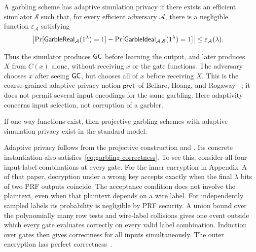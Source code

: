 \begin{definition}
\label{def:adaptive-garbling}
A garbling scheme has adaptive simulation privacy if there exists an
efficient simulator $\mathcal S$ such that, for every efficient adversary
$\mathcal A$, there is a negligible function $\varepsilon_{\mathcal A}$
satisfying
\[
  \left|
    \Pr[\mathsf{GarbleReal}_{\mathcal A}(1^\lambda)=1]
    -\Pr[\mathsf{GarbleIdeal}_{\mathcal A,\mathcal S}(1^\lambda)=1]
  \right|\leq\varepsilon_{\mathcal A}(\lambda).
\]
\end{definition}

Thus the simulator produces $\mathsf{GC}$ before learning the output, and later
produces $X$ from $C(x)$ alone, without receiving $x$ or the gate
functions.  The adversary chooses $x$ after seeing $\mathsf{GC}$, but chooses
all of $x$ before receiving $X$.  This is the coarse-grained adaptive
privacy notion $\mathsf{prv1}$ of Bellare, Hoang, and Rogaway~
\cite{BellareHoangRogaway2012Adaptive}; it does not permit several
input encodings for the same garbling.  Here adaptivity concerns input
selection, not corruption of a garbler.

\begin{theorem}[Hemenway et al.]
\label{thm:adaptive-garbling}
If one-way functions exist, then projective garbling schemes with
adaptive simulation privacy exist in the standard model.
\end{theorem}
Adaptive privacy follows from the projective construction and
\cite[full version, Corollary~2]{HemenwayEtAl2016AdaptiveGarbling}.
Its concrete instantiation also satisfies~\eqref{eq:garbling-correctness}.
To see this, consider all four input-label combinations at every gate.
For the inner encryption in Appendix~A of that paper, decryption under
a wrong key accepts exactly when the final $\lambda$ bits of two PRF
outputs coincide.  The acceptance condition does not involve the
plaintext, even when that plaintext depends on a wire label.  For independently sampled
labels its probability is negligible by PRF security.  A union bound
over the polynomially many row tests and wire-label collisions gives
one event outside which every gate evaluates correctly on every valid
label combination.  Induction over gates then gives correctness for
all inputs simultaneously.  The outer encryption has perfect
correctness~\cite[full version, Definition~2, Figure~1, and Appendix~A]
{HemenwayEtAl2016AdaptiveGarbling}.
